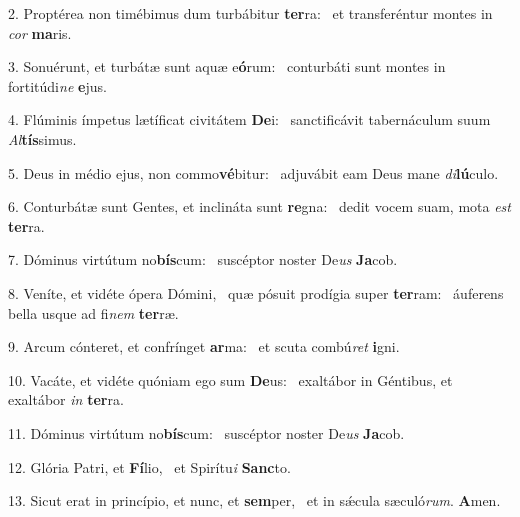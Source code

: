 2. Proptérea non timébimus dum turbábitur \textbf{ter}ra: \ast\  et transferéntur montes in \textit{cor} \textbf{ma}ris.\

3. Sonuérunt, et turbátæ sunt aquæ e\textbf{ó}rum: \ast\  conturbáti sunt montes in fortitúdi\textit{ne} \textbf{e}jus.\

4. Flúminis ímpetus lætíficat civitátem \textbf{De}i: \ast\  sanctificávit tabernáculum suum \textit{Al}\textbf{tís}simus.\

5. Deus in médio ejus, non commo\textbf{vé}bitur: \ast\  adjuvábit eam Deus mane \textit{di}\textbf{lú}culo.\

6. Conturbátæ sunt Gentes, et inclináta sunt \textbf{re}gna: \ast\  dedit vocem suam, mota \textit{est} \textbf{ter}ra.\

7. Dóminus virtútum no\textbf{bís}cum: \ast\  suscéptor noster De\textit{us} \textbf{Ja}cob.\

8. Veníte, et vidéte ópera Dómini, \dag\  quæ pósuit prodígia super \textbf{ter}ram: \ast\  áuferens bella usque ad fi\textit{nem} \textbf{ter}ræ.\

9. Arcum cónteret, et confrínget \textbf{ar}ma: \ast\  et scuta combú\textit{ret} \textbf{i}gni.\

10. Vacáte, et vidéte quóniam ego sum \textbf{De}us: \ast\  exaltábor in Géntibus, et exaltábor \textit{in} \textbf{ter}ra.\

11. Dóminus virtútum no\textbf{bís}cum: \ast\  suscéptor noster De\textit{us} \textbf{Ja}cob.\

12. Glória Patri, et \textbf{Fí}lio, \ast\  et Spirítu\textit{i} \textbf{Sanc}to.\

13. Sicut erat in princípio, et nunc, et \textbf{sem}per, \ast\  et in sǽcula sæculó\textit{rum}. \textbf{A}men.\

